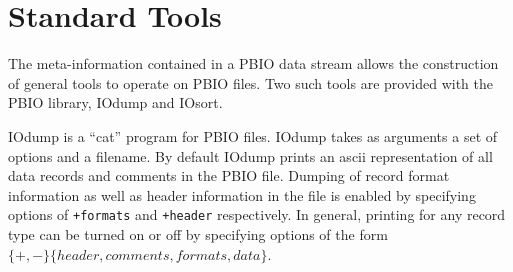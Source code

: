 \documentclass{article}
\begin{document}

%
%
%
\section{Standard Tools}
The meta-information contained in a PBIO data stream allows the construction
of general tools to operate on PBIO files.  Two such tools are provided with
the PBIO library, IOdump and IOsort.

IOdump is a ``cat'' program for PBIO files.  IOdump takes as arguments a set
of options and a filename.  By default IOdump prints an ascii representation
of all data records and comments in the PBIO file.  Dumping of record format
information as well as header information in the file is enabled by specifying
options of {\tt +formats} and {\tt +header} respectively.  In general,
printing for any record type can be turned on or off by specifying options
of the form $\{+,-\}\{header, comments, formats, data\}$.
\end{document}
